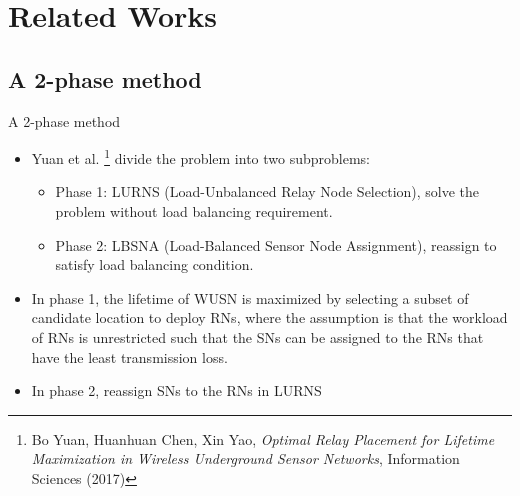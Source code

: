 \documentclass[main.tex]{subfiles}
\begin{document}
\section{Related Works}
\subsection{A 2-phase method}
\begin{frame}{A 2-phase method}
    \begin{itemize}
        \item {
            Yuan et al. \footnote{Bo Yuan, Huanhuan Chen, Xin Yao, \textit{Optimal Relay Placement for Lifetime Maximization in Wireless Underground Sensor Networks}, Information Sciences (2017)} divide the problem into two subproblems:
            \begin{itemize}
            \item Phase 1: LURNS (Load-Unbalanced Relay Node Selection), solve the problem without load balancing requirement.
            \item Phase 2: LBSNA (Load-Balanced Sensor Node Assignment), reassign to satisfy load balancing condition.
            \end{itemize}
        }
		\pause
        \item{
            In phase 1, the lifetime of WUSN is maximized by selecting a subset of candidate location to deploy RNs, where the assumption is that the workload of RNs is unrestricted such that the SNs can be assigned to the RNs that have the least transmission loss.
        }
		\pause
        \item{
            In phase 2, reassign SNs to the RNs in LURNS
        }
    \end{itemize}
\end{frame}
\end{document}
